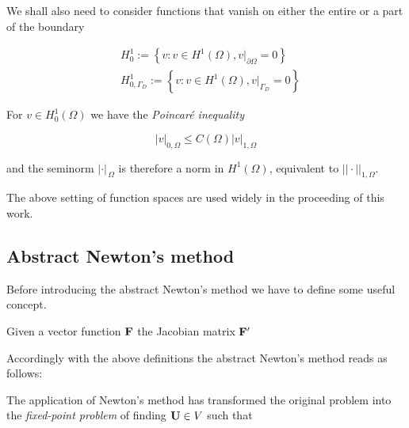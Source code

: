 We shall also need to consider functions that vanish on either the entire or a part of the boundary

\begin{align}
& H^1_0 :=  \left\{   v : v \in H^1(\Omega), v|_{\partial \Omega} = 0\right\} \label{space: h1 zero} \\
& H^1_{0,\Gamma_D} :=  \left\{   v : v \in H^1(\Omega), v|_{\Gamma_D} = 0\right\} \label{space: h1 zero gamma}
\end{align} 

For $v \in H^1_0(\Omega)$ we have the \textit{Poincar\'e inequality}

\begin{equation}
\label{eq: poincarre inequality}
|v|_{0,\Omega} \leq C(\Omega) |v|_{1,\Omega}
\end{equation}

and the seminorm $|\cdot |_{\,\Omega}$ is therefore a norm in $H^1(\Omega)$, equivalent to $||\cdot ||_{1,\Omega}$.

The above setting of function spaces are used widely in the proceeding of this work. 


\subsection{Abstract Newton's method}

Before introducing the abstract Newton's method we have to define some useful concept.

\begin{Definizione}

\end{Definizione}


\begin{Definizione}
Given a vector function $\mathbf{F}$ the Jacobian matrix $\mathbf{F}'$ 
\end{Definizione}

Accordingly with the above definitions the abstract Newton's method reads as follows:


\vspace{0.3cm}
The application of Newton's method has transformed the original problem  into the \textit{fixed-point problem} of finding $\mathbf{U} \in V$ such that

